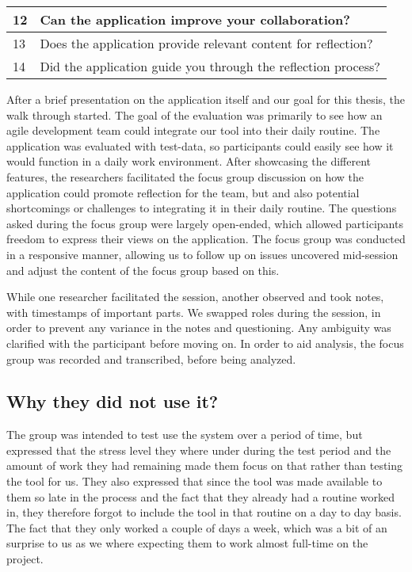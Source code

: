 \begin{table}[H]
\begin{tabularx}{\textwidth}{|l|X|}
    12 & Can the application improve your collaboration?                                                      \\ \hline
    13 & Does the application provide relevant content for reflection?                                        \\ \hline
    14 & Did the application guide you through the reflection process?                                        \\ \hline
    \end{tabularx}
    \caption{}
    \label{questiontable}
\end{table}

After a brief presentation on the application itself and our goal for this thesis, the walk through started. The goal of the evaluation was primarily to see how an agile development team could integrate our tool into their daily routine. The application was evaluated with test-data, so participants could easily see how it would function in a daily work environment. After showcasing the different features, the researchers facilitated the focus group discussion on how the application could promote reflection for the team, but and also potential shortcomings or challenges to integrating it in their daily routine. The questions asked during the focus group were largely open-ended, which allowed participants freedom to express their views on the application\citep{yin2008case}. The focus group was conducted in a responsive manner, allowing us to follow up on issues uncovered mid-session and adjust the content of the focus group based on this\citep{rubin2011qualitative, wengraf2001qualitative}.

While one researcher facilitated the session, another observed and took notes, with timestamps of important parts. We swapped roles during the session, in order to prevent any variance in the notes and questioning. Any ambiguity was clarified with the participant before moving on. In order to aid analysis, the focus group was recorded and transcribed, before being analyzed. 

\subsection{Why they did not use it?}
The group was intended to test use the system over a period of time, but expressed that the stress level they where under during the test period and the amount of work they had remaining made them focus on that rather than testing the tool for us. They also expressed that since the tool was made available to them so late in the process and the fact that they already had a routine worked in, they therefore forgot to include the tool in that routine on a day to day basis. The fact that they only worked a couple of days a week, which was a bit of an surprise to us as we where expecting them to work almost full-time on the project.

